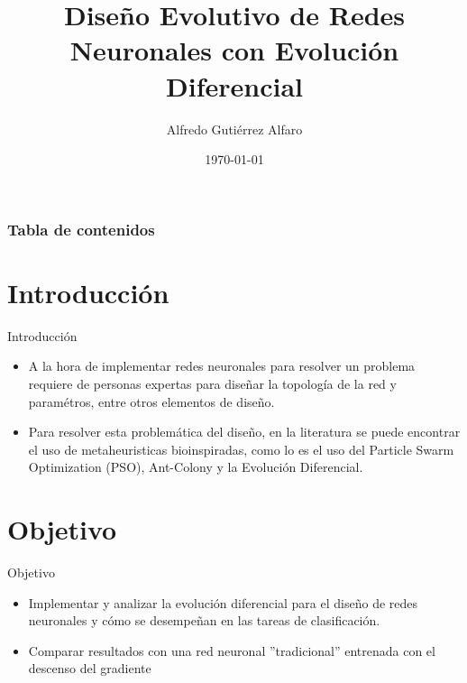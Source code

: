 \documentclass[
  11,
  ignorenonframetext,
  aspectratio=169,
  xcolor=table,
]{beamer}
\title{Diseño Evolutivo de Redes Neuronales con Evolución Diferencial}
\author{Alfredo Gutiérrez Alfaro}
\date{\today}
\begin{document}
\frame{\titlepage}

\begin{frame}[shrink=5]
  \frametitle{Tabla de contenidos}
  \tableofcontents[hideallsubsections]
\end{frame}

\section{Introducción}
\begin{frame}{Introducción}
  \protect\hypertarget{introducciuxf3n}{}
  \begin{itemize}
    \item
          A la hora de implementar redes neuronales para resolver un problema
          requiere de personas expertas para diseñar la topología de la red y
          paramétros, entre otros elementos de diseño. \cite{lopez-vazquez-2019}
    \item
          Para resolver esta problemática del diseño, en la literatura se puede
          encontrar el uso de metaheuristicas bioinspiradas, como lo es el uso
          del Particle Swarm Optimization (PSO), Ant-Colony y la Evolución
          Diferencial. \cite{garro-2015,lopez-vazquez-2019,Alba-Cisneros2020}
  \end{itemize}
\end{frame}

\section{Objetivo}
\begin{frame}{Objetivo}
  \protect\hypertarget{objetivo}{}
  \begin{itemize}
    \item
          Implementar y analizar la evolución diferencial para el diseño de
          redes neuronales y cómo se desempeñan en las tareas de clasificación.
    \item
          Comparar resultados con una red neuronal ''tradicional'' entrenada con
          el descenso del gradiente
  \end{itemize}
\end{frame}
\end{document}
